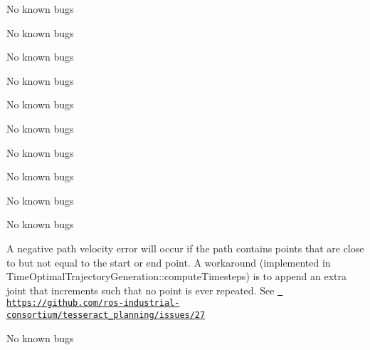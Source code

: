 \begin{DoxyRefList}
\label{bug__bug000210}%
%
No known bugs 
\item[File \mbox{\hyperlink{task__input_8cpp}{task\+\_\+input.cpp}} ]\label{bug__bug000211}%
%
No known bugs 
\item[File \mbox{\hyperlink{task__input_8h}{task\+\_\+input.h}} ]\label{bug__bug000174}%
%
No known bugs 
\item[File \mbox{\hyperlink{taskflow__container_8cpp}{taskflow\+\_\+container.cpp}} ]\label{bug__bug000212}%
%
No known bugs 
\item[File \mbox{\hyperlink{taskflow__container_8h}{taskflow\+\_\+container.h}} ]\label{bug__bug000175}%
%
No known bugs 
\item[File \mbox{\hyperlink{taskflow__generator_8h}{taskflow\+\_\+generator.h}} ]\label{bug__bug000176}%
%
No known bugs 
\item[File \mbox{\hyperlink{taskflow__interface_8h}{taskflow\+\_\+interface.h}} ]\label{bug__bug000177}%
%
No known bugs

\label{bug__bug000213}%
%
No known bugs 
\item[File \mbox{\hyperlink{taskflow__profiling__example_8cpp}{taskflow\+\_\+profiling\+\_\+example.cpp}} ]\label{bug__bug000165}%
%
No known bugs 
\item[File \mbox{\hyperlink{taskflow__visualization__utils_8h}{taskflow\+\_\+visualization\+\_\+utils.h}} ]\label{bug__bug000203}%
%
No known bugs 
\item[Member \mbox{\hyperlink{classtesseract__planning_1_1totg_1_1Trajectory_a78d9b62367b7178b2d23eaf185969319}{tesseract\+\_\+planning\+::totg\+::Trajectory\+::Trajectory}} (const \mbox{\hyperlink{classtesseract__planning_1_1totg_1_1Path}{Path}} \&path, const Eigen\+::\+Vector\+Xd \&max\+\_\+velocity, const Eigen\+::\+Vector\+Xd \&max\+\_\+acceleration, double time\+\_\+step=0.\+001)]\label{bug__bug000239}%
%
A negative path velocity error will occur if the path contains points that are close to but not equal to the start or end point. A workaround (implemented in Time\+Optimal\+Trajectory\+Generation\+::compute\+Timesteps) is to append an extra joint that increments such that no point is ever repeated. See \href{https://github.com/ros-industrial-consortium/tesseract_planning/issues/27}{\texttt{ https\+://github.\+com/ros-\/industrial-\/consortium/tesseract\+\_\+planning/issues/27}}  
\item[File \mbox{\hyperlink{time__optimal__trajectory__generation__task__generator_8h}{time\+\_\+optimal\+\_\+trajectory\+\_\+generation\+\_\+task\+\_\+generator.h}} ]\label{bug__bug000223}%
%
No known bugs


\end{DoxyRefList}
